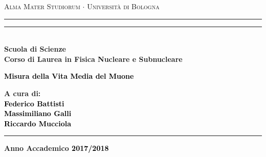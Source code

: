 \documentclass{standalone}
\begin{document}
\begin{titlepage}

\begin{center}
{{\Large{\textsc{Alma Mater Studiorum $\cdot$ Universit\`a di Bologna}}}}
\rule[0.1cm]{15.8cm}{0.1mm}
\rule[0.5cm]{15.8cm}{0.6mm}
\\\vspace{3mm}
{\small{\bf Scuola di Scienze \\ Corso di Laurea in Fisica Nucleare e Subnucleare}}
\end{center}

\vspace{23mm}

\begin{center}\textcolor{black}
{{\LARGE{\bf Misura della Vita Media del Muone}}\\}
\end{center}

\vspace{50mm} \par \noindent

\begin{minipage}[t]{0.47\textwidth}
  {\large{\bf A cura di: \vspace{2mm}\\\textcolor{black}{Federico Battisti}\\\textcolor{black}{Massimiliano Galli}\\\textcolor{black}{Riccardo Mucciola}\\}}
\end{minipage}

\hfill

\vspace{40mm}
\begin{center}
\rule[0.1cm]{15.8cm}{0.1mm}
{\large{\bf Anno Accademico \textcolor{black}{2017/2018}}}
\end{center}


\end{titlepage}


\tableofcontents
\end{document}
